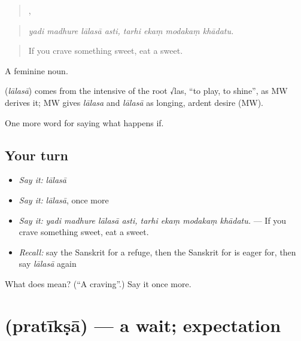 \begin{quote}
   ,    
\end{quote}

\begin{quote}
\emph{yadi madhure lālasā asti, tarhi ekaṃ modakaṃ khādatu.}
\end{quote}

\begin{quote}
If you crave something sweet, eat a sweet.
\end{quote}

A feminine noun.

\begin{cousinweb}
\textbf{} (\emph{lālasā}) comes from the intensive of the root √las, \textquotedblleft{}to play, to shine\textquotedblright{}, as MW derives it; MW gives \emph{lālasa} and \emph{lālasā} as longing, ardent desire (MW).
\end{cousinweb}

\begin{grammarlens}[title={What you've built}]
One more word for saying what happens if.
\end{grammarlens}

\subsection*{Your turn}
\begin{itemize}
\raggedright
  \item \emph{Say it:} \emph{lālasā}
  \item \emph{Say it:} \emph{lālasā}, once more
  \item \emph{Say it:} \emph{yadi madhure lālasā asti, tarhi ekaṃ modakaṃ khādatu.} — If you crave something sweet, eat a sweet.
  \item \emph{Recall:} say the Sanskrit for a refuge, then the Sanskrit for is eager for, then say \emph{lālasā} again
\end{itemize}

\begin{tcolorbox}[breakable,colback=teal!4,colframe=teal!35!black,title={Before you move on}]
What does  mean? (\textquotedblleft{}A craving\textquotedblright{}.) Say it once more.
\end{tcolorbox}
\section[\texorpdfstring{\sk{प्रतीक्षा} (pratīkṣā)}{प्रतीक्षा (pratīkṣā)}]{ (pratīkṣā) — a wait; expectation}

